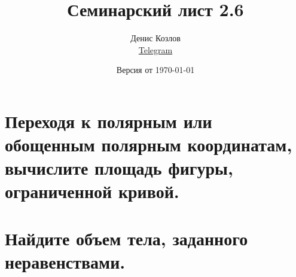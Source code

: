\documentclass[a4paper, fleqn]{article}
\title{Семинарский лист 2.6}
\author{
    Денис Козлов         \\ \href{https://t.me/DKozl50}{Telegram} \and
}
\date{Версия от {\ddmmyyyydate\today} \currenttime}
\begin{document}
    \maketitle
    
    \section*{Переходя к полярным или обощенным полярным координатам, вычислите площадь фигуры, ограниченной кривой.}
    
    
    
    
    

    \section*{Найдите объем тела, заданного неравенствами.}
    
    
    
\end{document}
